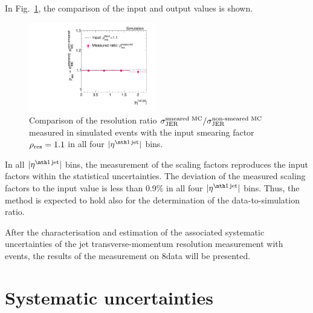 In Fig.~\ref{res:fig:MCClosureRatio}, the comparison of the input and output values is shown. 
\begin{figure}[t]
  \centering
    \includegraphics[width=0.49\textwidth]{figures/resolution/methodology/MCClosureRatio.pdf}
     \caption{Comparison of the resolution ratio $\sigma_\mathrm{JER}^{\text{smeared MC}}/\sigma_\mathrm{JER}^{\text{non-smeared MC}}$ measured in simulated events with the input smearing factor $\rho_\mathrm{res}=1.1$ in all four $|\etafirstjet|$ bins.}
  \label{res:fig:MCClosureRatio}
\end{figure}
In all $|\etafirstjet|$ bins, the measurement of the scaling factors reproduces the input factors within the statistical uncertainties.
The deviation of the measured scaling factors to the input value is less than 0.9\% in all four $|\etafirstjet|$ bins.
Thus, the method is expected to hold also for the determination of the data-to-simulation ratio.

After the characterisation and estimation of the associated systematic uncertainties of the jet transverse-momentum resolution measurement with \GAMJET events, the results of the measurement on 8\tev data will be presented.



\FloatBarrier
\chapter{Systematic uncertainties}

